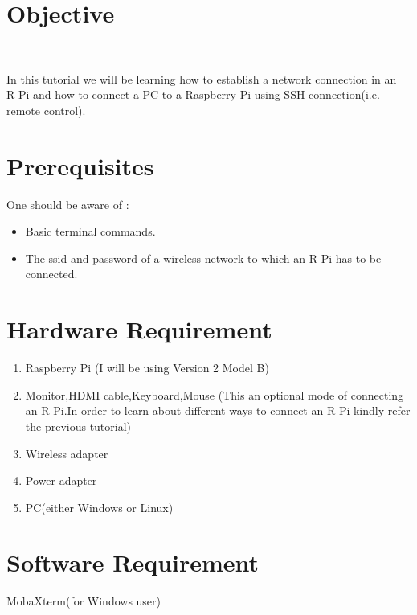 \documentclass[11pt,a4paper]{report}
\begin{document}
	\section{Objective}\
	\begin{flushleft}
	In this tutorial we will be learning how to establish a network connection in an R-Pi and how to connect a PC to a Raspberry Pi using SSH connection(i.e. remote control).
	
	\section{Prerequisites}
	One should be aware of :
	\begin{itemize}
		\item Basic terminal commands.
		\item The ssid and password of a wireless network to which an R-Pi has to be connected.
	\end{itemize}
	
	\section{Hardware Requirement}
	\begin{enumerate}
		\item Raspberry Pi (I will be using Version 2 Model B)
		\item Monitor,HDMI cable,Keyboard,Mouse (This an optional mode of connecting an R-Pi.In order to learn about different ways to connect an R-Pi kindly refer the previous tutorial)
		\item Wireless adapter
		\item Power adapter
		\item PC(either Windows or Linux)
	\end{enumerate}
		
	\section{Software Requirement}
	MobaXterm(for Windows user)
	
	\newpage

\end{flushleft}
\end{document}
